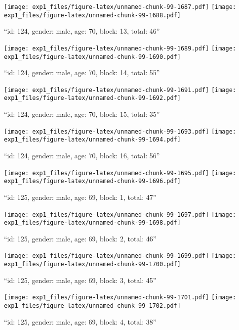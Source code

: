 \documentclass[,]{article}
\begin{document}
\texttt{[image: exp1\_files/figure-latex/unnamed-chunk-99-1687.pdf]}
\texttt{[image: exp1\_files/figure-latex/unnamed-chunk-99-1688.pdf]}

\newpage
[1] 

``id: 124, gender: male, age: 70, block: 13, total: 46''

\texttt{[image: exp1\_files/figure-latex/unnamed-chunk-99-1689.pdf]}
\texttt{[image: exp1\_files/figure-latex/unnamed-chunk-99-1690.pdf]}

\newpage
[1] 

``id: 124, gender: male, age: 70, block: 14, total: 55''

\texttt{[image: exp1\_files/figure-latex/unnamed-chunk-99-1691.pdf]}
\texttt{[image: exp1\_files/figure-latex/unnamed-chunk-99-1692.pdf]}

\newpage
[1] 

``id: 124, gender: male, age: 70, block: 15, total: 35''

\texttt{[image: exp1\_files/figure-latex/unnamed-chunk-99-1693.pdf]}
\texttt{[image: exp1\_files/figure-latex/unnamed-chunk-99-1694.pdf]}

\newpage
[1] 

``id: 124, gender: male, age: 70, block: 16, total: 56''

\texttt{[image: exp1\_files/figure-latex/unnamed-chunk-99-1695.pdf]}
\texttt{[image: exp1\_files/figure-latex/unnamed-chunk-99-1696.pdf]}

\newpage
[1] 

``id: 125, gender: male, age: 69, block: 1, total: 47''

\texttt{[image: exp1\_files/figure-latex/unnamed-chunk-99-1697.pdf]}
\texttt{[image: exp1\_files/figure-latex/unnamed-chunk-99-1698.pdf]}

\newpage
[1] 

``id: 125, gender: male, age: 69, block: 2, total: 46''

\texttt{[image: exp1\_files/figure-latex/unnamed-chunk-99-1699.pdf]}
\texttt{[image: exp1\_files/figure-latex/unnamed-chunk-99-1700.pdf]}

\newpage
[1] 

``id: 125, gender: male, age: 69, block: 3, total: 45''

\texttt{[image: exp1\_files/figure-latex/unnamed-chunk-99-1701.pdf]}
\texttt{[image: exp1\_files/figure-latex/unnamed-chunk-99-1702.pdf]}

\newpage
[1] 

``id: 125, gender: male, age: 69, block: 4, total: 38''
\end{document}
